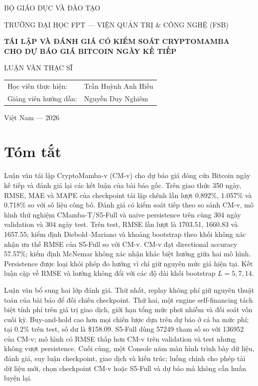\documentclass[13pt,a4paper,oneside]{report}
\begin{document}
\sloppy

\begin{titlepage}
\centering
{\large BỘ GIÁO DỤC VÀ ĐÀO TẠO\par}
{\large TRƯỜNG ĐẠI HỌC FPT --- VIỆN QUẢN TRỊ \& CÔNG NGHỆ (FSB)\par}
\vfill
{\LARGE\bfseries TÁI LẬP VÀ ĐÁNH GIÁ CÓ KIỂM SOÁT CRYPTOMAMBA\\[6pt]
CHO DỰ BÁO GIÁ BITCOIN NGÀY KẾ TIẾP\par}
\vspace{10pt}
{\large LUẬN VĂN THẠC SĨ\par}
\vfill
\begin{flushright}
\begin{tabular}{@{}ll@{}}
Học viên thực hiện: & Trần Huỳnh Anh Hiếu \\
Giảng viên hướng dẫn: & Nguyễn Duy Nghiêm \\
\end{tabular}
\end{flushright}
\vfill
{\large Việt Nam --- 2026\par}
\end{titlepage}


\chapter*{Tóm tắt}
Luận văn tái lập CryptoMamba-v (CM-v) cho dự báo giá đóng cửa Bitcoin ngày kế tiếp và đánh giá lại
các kết luận của bài báo gốc. Trên giao thức 350 ngày, RMSE, MAE và MAPE của checkpoint tái lập
chênh lần lượt \num{0.892}\%, \num{1.057}\% và \num{0.718}\% so với số liệu công bố. Đánh giá có
kiểm soát tiếp theo so sánh CM-v, mô hình thử nghiệm CMamba-T/S5-Full và naive persistence trên cùng
304 ngày validation và 304 ngày test. Trên test, RMSE lần lượt là \num{1703.51}, \num{1660.83} và
\num{1657.55}; kiểm định Diebold--Mariano và khoảng bootstrap theo khối không xác nhận ưu thế RMSE
của S5-Full so với CM-v. CM-v đạt directional accuracy \num{57.57}\%; kiểm định McNemar không xác
nhận khác biệt hướng giữa hai mô hình. Persistence được loại khỏi phép đo hướng vì chỉ giữ nguyên
mức giá hiện tại.
Kết luận cặp về RMSE và hướng không đổi với các độ dài khối bootstrap
$L=\num{5},\num{7},\num{14}$.

Luận văn bổ sung hai lớp đánh giá. Thứ nhất, replay không phí giữ nguyên thuật toán của bài báo để
đối chiếu checkpoint. Thứ hai, một engine self-financing tách biệt tính phí trên giá trị giao dịch,
giới hạn tổng mức phơi nhiễm và đối soát vốn cuối kỳ. Buy-and-hold cao hơn mọi chiến lược dựa trên
dự báo ở cả ba mức phí; tại \num{0.2}\% trên test, số dư là \$\num{158.09}. S5-Full dùng
\num{57249} tham số so với
\num{136952} của CM-v; mô hình có RMSE thấp hơn CM-v trên validation và test nhưng không vượt
persistence. Cuối cùng, một Console năm màn hình trình bày dữ liệu, đánh giá, suy luận checkpoint,
giao dịch và kiến trúc; luồng chính cho phép tải dữ liệu mới, chọn checkpoint CM-v hoặc S5-Full và
dự báo mà không cần huấn luyện lại.
\end{document}
